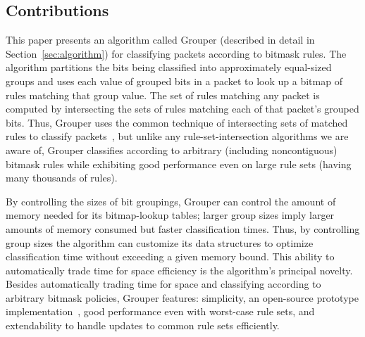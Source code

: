 \documentclass[10pt, conference, compsocconf]{IEEEtran}
\begin{document}


\subsection{Contributions}
This paper presents an algorithm called Grouper (described in detail in
Section~\ref{sec:algorithm}) for classifying packets according to bitmask rules.
The algorithm partitions the bits being classified into approximately
equal-sized groups and uses each value of grouped bits in a packet to look up a
bitmap of rules matching that group value.  The set of rules matching any packet
is computed by intersecting the sets of rules matching each of that packet's
grouped bits.  Thus, Grouper uses the common technique of intersecting sets of
matched rules to classify packets~\cite{speed,pankaj+,babo-journal}, but unlike
any rule-set-intersection algorithms we are aware of, Grouper classifies
according to arbitrary (including noncontiguous) bitmask rules while exhibiting
good performance even on large rule sets (having many thousands of rules).

By controlling the sizes of bit groupings, Grouper can control the amount of
memory needed for its bitmap-lookup tables; larger group sizes imply larger
amounts of memory consumed but faster classification times.  Thus, by
controlling group sizes the algorithm can customize its data structures to
optimize classification time without exceeding a given memory bound.  This
ability to automatically trade time for space efficiency is the algorithm's
principal novelty.  Besides automatically trading time for space and classifying
according to arbitrary bitmask policies, Grouper features: simplicity, an
open-source prototype implementation~\cite{webpage}, good performance even with
worst-case rule sets, and extendability to handle updates to common rule sets
efficiently.
\end{document}
